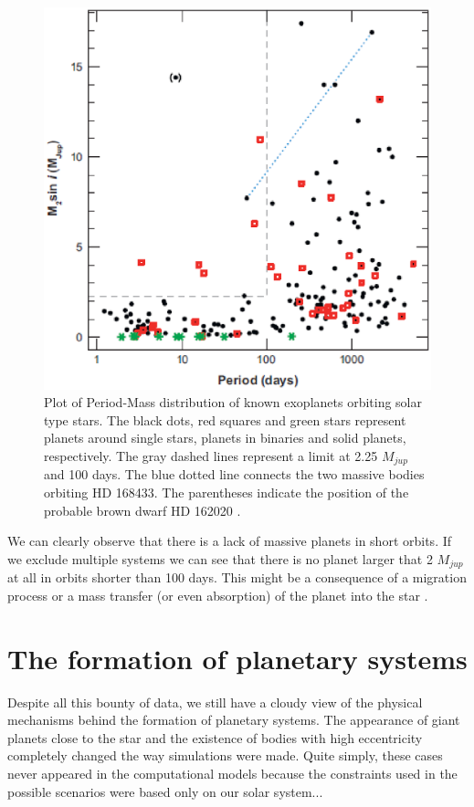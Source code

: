 \documentclass[dvips,12pt,a4paper]{report}
\begin{document}
\begin{figure}[h]
\centering
\includegraphics[height=10 cm]{pics/massplanet2}
\caption[Period Mass distributions of known extrasolar planets ]{Plot of Period-Mass distribution of known exoplanets orbiting solar type stars. The black dots, red squares and green stars represent planets around single stars, planets in binaries and solid planets, respectively. The gray dashed lines represent a limit at 2.25 $M_{jup}$ and 100 days. The blue dotted line connects the two massive bodies orbiting HD 168433. The parentheses indicate the position of the probable brown dwarf HD 162020 \citep{Udry-2007}. }
\label{planetmass}
\end{figure}

We can clearly observe that there is a lack of massive planets in short orbits. If we exclude multiple systems we can see that there is no planet larger that 2 $M_{jup}$ at all in orbits shorter than 100 days. This might be a consequence of a migration process or a mass transfer (or even absorption) of the planet into the star \citep[e.g.][]{Trilling-1998}. %
 
\section {The formation of planetary systems}
\label {planets}
\indent Despite all this bounty of data, we still have a cloudy view of the physical mechanisms behind the formation of planetary systems. The appearance of giant planets close to the star and the existence of bodies with high eccentricity completely changed the way simulations were made. Quite simply, these cases never appeared in the computational models because the constraints used in the possible scenarios were based only on our solar system...
\end{document}
